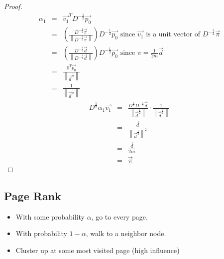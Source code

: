 \documentclass[12pt]{article}
\newcommand\norm[1]{\left\lVert#1\right\rVert}
\begin{document}
\begin{proof}
\begin{eqnarray*}
\alpha_1 &=& \vec{v_1}^TD^{-\frac{1}{2}}\vec{p_0} \\
&=& \left( \frac{D^{-\frac{1}{2}}\vec{\pi}}{\norm{D^{-\frac{1}{2}}\vec{\pi}}}\right)D^{-\frac{1}{2}}\vec{p_0} \text{\ \ \ \ \ \ \ \ \ \ since } \vec{v_1} \text{ is a unit vector of } D^{-\frac{1}{2}}\vec{\pi}\\
&=& \left( \frac{D^{-\frac{1}{2}}\vec{d}}{\norm{D^{-\frac{1}{2}}\vec{d}}}\right) D^{-\frac{1}{2}}\vec{p_0} \text{\ \ \ \ \ \ \ \ \ \ since } \pi = \frac{1}{2m}\vec{d}\\
&=& \frac{\mathds{1}^T\vec{p_0}}{\norm{\vec{d}^\frac{1}{2}}}\\
&=& \frac{1}{\norm{\vec{d}^\frac{1}{2}}}
\end{eqnarray*}
\begin{eqnarray*}
D^{\frac{1}{2}}\alpha_1\vec{v_1} &=& \frac{D^{\frac{1}{2}}D^{-\frac{1}{2}}\vec{d}}{\norm{\vec{d}^{\frac{1}{2}}}} \cdot \frac{1}{\norm{\vec{d}^\frac{1}{2}}}\\
&=& \frac{\vec{d}}{\norm{\vec{d}^{\frac{1}{2}}}^2}\\
&=& \frac{\vec{d}}{2m}\\
&=& \vec{\pi}
\end{eqnarray*}
\end{proof}

\subsection{Page Rank}
\begin{itemize}
\item With some probability $\alpha$, go to every page.
\item With probability $1-\alpha$, walk to a neighbor node.
\item Cluster up at some most visited page (high influence)
\end{itemize}
\end{document}
